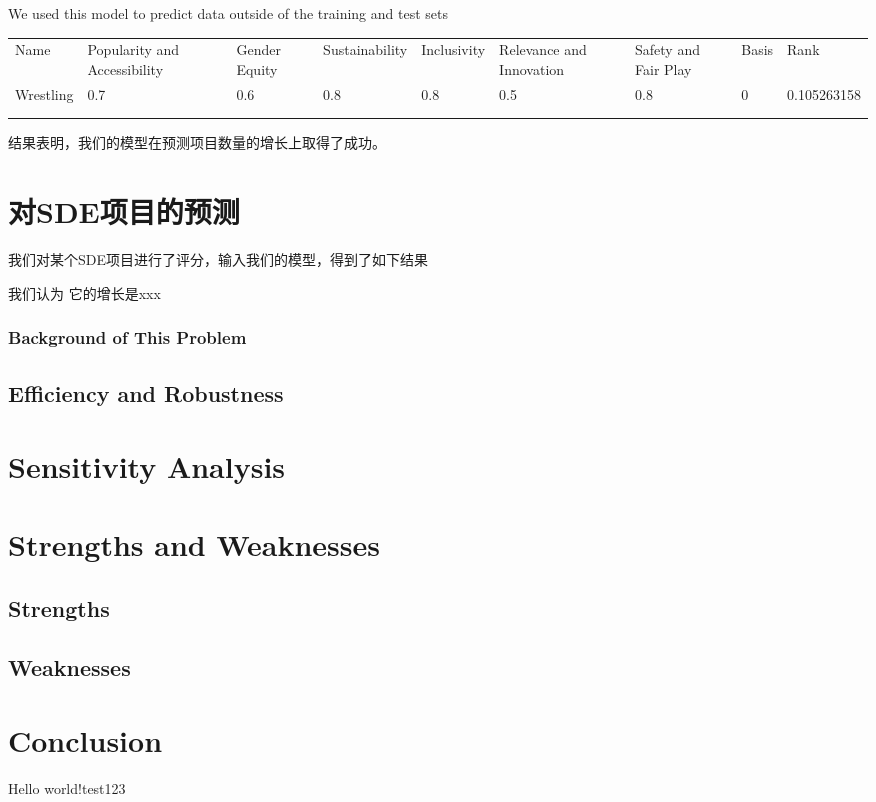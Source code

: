 \documentclass[a4paper]{article}
\begin{document}
We used this model to predict data outside of the training and test sets

\begin{table}[]
    \begin{tabular}{lllllllll}
    Name      & Popularity and Accessibility & Gender Equity & Sustainability & Inclusivity & Relevance and Innovation & Safety and Fair Play & Basis & Rank        \\
    Wrestling & 0.7                          & 0.6           & 0.8            & 0.8         & 0.5                      & 0.8                  & 0     & 0.105263158 \\
              &                              &               &                &             &                          &                      &       &             \\
              &                              &               &                &             &                          &                      &       &            
    \end{tabular}
    \end{table}

结果表明，我们的模型在预测项目数量的增长上取得了成功。



\section{对SDE项目的预测}
我们对某个SDE项目进行了评分，输入我们的模型，得到了如下结果

我们认为 它的增长是xxx
\subsubsection{Background of This Problem}
\subsection{Efficiency and Robustness}
\section{Sensitivity Analysis}
\section{Strengths and Weaknesses}
\subsection{Strengths}
\subsection{Weaknesses}
\section{Conclusion}
Hello world!test123
\end{document}
